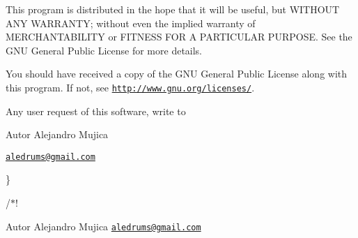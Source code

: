 This program is distributed in the hope that it will be useful, but W\+I\+T\+H\+O\+UT A\+NY W\+A\+R\+R\+A\+N\+TY; without even the implied warranty of M\+E\+R\+C\+H\+A\+N\+T\+A\+B\+I\+L\+I\+TY or F\+I\+T\+N\+E\+SS F\+OR A P\+A\+R\+T\+I\+C\+U\+L\+AR P\+U\+R\+P\+O\+SE. See the G\+NU General Public License for more details.

You should have received a copy of the G\+NU General Public License along with this program. If not, see \href{http://www.gnu.org/licenses/}{\tt http\+://www.\+gnu.\+org/licenses/}.

Any user request of this software, write to

\begin{DoxyAuthor}{Autor}
Alejandro Mujica
\end{DoxyAuthor}
\href{mailto:aledrums@gmail.com}{\tt aledrums@gmail.\+com}

\}

/$\ast$!

\begin{DoxyAuthor}{Autor}
Alejandro Mujica  \href{mailto:aledrums@gmail.com}{\tt aledrums@gmail.\+com} 
\end{DoxyAuthor}
